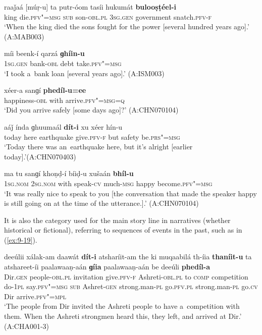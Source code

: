 \begin{exe}
\ex
\label{ex:9-14}
\gll raaǰaá [múṛ-u] ta putr-óom tasíi hukumát \textbf{bulooṣṭéel-i} \\
king die.\textsc{pfv"=msg} \textsc{sub} son-\textsc{obl.pl} \textsc{3sg.gen} government snatch.\textsc{pfv-f} \\
\glt `When the king died the sons fought for the power [several hundred years ago].' (A:MAB003)

\ex
\label{ex:9-15}
\gll míi beenk-í qarzá \textbf{ɡhíin-u}  \\
\textsc{1sg.gen} bank-\textsc{obl} debt take.\textsc{pfv"=msg} \\
\glt `I took a~bank loan [several years ago].' (A:ISM003) 

\ex
\label{ex:9-16}
\gll xéer-a sanɡí \textbf{phedíl-u=ee} \\
happiness-\textsc{obl} with arrive.\textsc{pfv"=msg=q} \\
\glt `Did you arrive safely [some days ago]?' (A:CHN070104)

\ex
\label{ex:9-17}
\gll aáǰ índa ɡhuumaál \textbf{dít-i} xu xéer hín-u\\
today here earthquake give.\textsc{pfv-f} but safety be.\textsc{prs"=msg}  \\
\glt `Today there was an~earthquake here, but it's alright [earlier today].'\newline (A:CHN070403)

\ex
\label{ex:9-18}
\gll ma tu sanɡí khoṇḍ-í bíiḍ-u xušaán \textbf{bhíl-u} \\
\textsc{1sg.nom} \textsc{2}\textsc{sg.nom} with speak-\textsc{cv} much-\textsc{msg} happy become.\textsc{pfv"=msg} \\
\glt `It was really nice to speak to you [the conversation that made the speaker happy is still going on at the time of the utterance.].' (A:CHN070104)
\end{exe}

It is also the category used for the main story line in narratives (whether historical or fictional), referring to sequences of events in the past, such as in (\ref{ex:9-19}).
\begin{exe}
\ex
\label{ex:9-19}
\gll deeúlii xálak-am daawát \textbf{dít-i} atsharíit-am the ki muqaabilá th-íia \textbf{thaníit-u} ta atshareet-íi paalawaaṇ-aán \textbf{ɡíia} paalawaaṇ-aán be deeúli \textbf{phedíl-a}\\
Dir.\textsc{gen} people-\textsc{obl.pl} invitation give.\textsc{pfv-f}  Ashreti-\textsc{obl.pl} to \textsc{comp} competition do-\textsc{1pl}  say.\textsc{pfv"=msg} \textsc{sub} Ashret-\textsc{gen} strong.man-\textsc{pl} go.\textsc{pfv.pl}  strong.man-\textsc{pl} go.\textsc{cv} Dir arrive.\textsc{pfv"=mpl} \\
\glt `The people from Dir invited the Ashreti people to have a~competition with them. When the Ashreti strongmen heard this, they left, and arrived at Dir.' (A:CHA001-3)
\end{exe}

